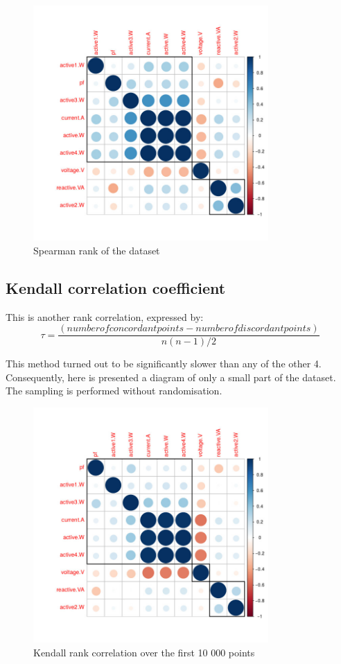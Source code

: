 \documentclass[11pt]{article}
\newcommand{\para}[0]{\par\vspace{0.5cm}}
\begin{document}
\begin{figure}[!htp]
  \centering
    \includegraphics[width=0.8\textwidth]{img/spearman}
    \caption{Spearman rank of the dataset}
\end{figure}

\subsection{Kendall correlation coefficient}
This is another rank correlation, expressed by\cite{q10}:
$$ \tau = \frac{({number of concordant points}-{number of discordant points})}
                 {n(n-1)/2} $$
\para
This method turned out to be significantly slower than any of the other 4.
Consequently, here is presented a diagram of only a small part of the dataset.
The sampling is performed without randomisation.

\begin{figure}[!htp]
  \centering
    \includegraphics[width=0.8\textwidth]{img/kendall}
    \caption{Kendall rank correlation over the first 10 000 points}
\end{figure}
\end{document}
